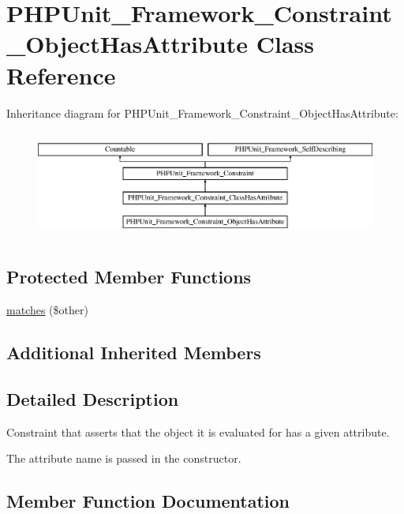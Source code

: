 \hypertarget{class_p_h_p_unit___framework___constraint___object_has_attribute}{}\section{P\+H\+P\+Unit\+\_\+\+Framework\+\_\+\+Constraint\+\_\+\+Object\+Has\+Attribute Class Reference}
\label{class_p_h_p_unit___framework___constraint___object_has_attribute}
Inheritance diagram for P\+H\+P\+Unit\+\_\+\+Framework\+\_\+\+Constraint\+\_\+\+Object\+Has\+Attribute\+:\begin{figure}[H]
\begin{center}
\leavevmode
\includegraphics[height=3.578275cm]{class_p_h_p_unit___framework___constraint___object_has_attribute}
\end{center}
\end{figure}
\subsection*{Protected Member Functions}
\begin{DoxyCompactItemize}
\item 
\mbox{\hyperlink{class_p_h_p_unit___framework___constraint___object_has_attribute_a9c9c337de483bbdbb9fa249a6c7c9cc5}{matches}} (\$other)
\end{DoxyCompactItemize}
\subsection*{Additional Inherited Members}


\subsection{Detailed Description}
Constraint that asserts that the object it is evaluated for has a given attribute.

The attribute name is passed in the constructor. 

\subsection{Member Function Documentation}
\mbox{\label{class_p_h_p_unit___framework___constraint___object_has_attribute_a9c9c337de483bbdbb9fa249a6c7c9cc5}} 
